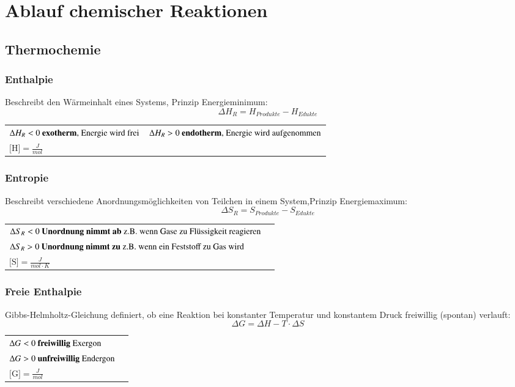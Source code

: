 \section{Ablauf chemischer Reaktionen}

\subsection{Thermochemie}
\subsubsection{Enthalpie}
Beschreibt den Wärmeinhalt eines Systems, Prinzip Energieminimum:
$$\boxed{\Delta H_R = H_{Produkte} - H_{Edukte}} $$
\begin{tabular}{l l}
	$\Delta H_R < 0 \text{ \textbf{exotherm}, Energie wird frei}$ & $\Delta H_R > 0 \text{ \textbf{endotherm}, Energie wird aufgenommen}$ \\
	$\text{[H]} =\frac{J}{mol}$ & \\
\end{tabular}
\subsubsection{Entropie}
Beschreibt verschiedene Anordnungsmöglichkeiten von Teilchen in einem System,\break Prinzip Energiemaximum:
$$\boxed{\Delta S_R = S_{Produkte} - S_{Edukte}} $$
\begin{tabular}{l l}
	$\Delta S_R < 0 \text{  \textbf{Unordnung nimmt ab} z.B. wenn Gase zu Flüssigkeit reagieren}$ &  \\
	$\Delta S_R > 0 \text{  \textbf{Unordnung nimmt zu} z.B. wenn ein Feststoff zu Gas wird}$     &  \\
	$\text{[S]}=\frac{J}{mol \cdot K}$                                                            & \\
\end{tabular}

\subsubsection{Freie Enthalpie}
Gibbs-Helmholtz-Gleichung definiert, ob eine Reaktion bei konstanter Temperatur und konstantem Druck freiwillig (spontan) verlauft:
$$\boxed{\Delta G = \Delta H - T \cdot \Delta S} $$
\begin{tabular}{l l}
	$\Delta G < 0 \text{  \textbf{freiwillig} Exergon}$    &  \\
	$\Delta G > 0 \text{  \textbf{unfreiwillig} Endergon}$ &  \\
	$\text{[G]}=\frac{J}{mol}$                             & \\
\end{tabular}

